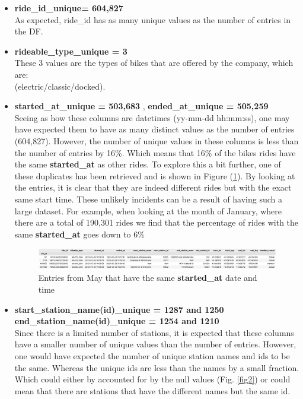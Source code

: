 \documentclass[12pt]{article}
\begin{document}
	\begin{itemize}
	\item \textbf{ride\_id\_unique= 604,827}   \\
	As expected, ride\_id has as many unique values as the number of entries in the DF.
	\item \textbf{rideable\_type\_unique = 3}  \\
	These 3 values are the types of bikes that are offered by the company, which are: \\
	(electric/classic/docked).
	\item \textbf{started\_at\_unique = 503,683} , \textbf{ended\_at\_unique = 505,259} \\
	Seeing as how these columns are datetimes (yy-mm-dd hh:mm:ss), one may have expected them to have as many distinct values as the number of entries (604,827). However, the number of unique values in these columns is less than the number of entries by 16\%. Which means that 16\% of the bikes rides have the same \textbf{started\_at} as other rides. To explore this a bit further, one of these duplicates has been retrieved and is shown in Figure (\underline{\ref{fig10}}). By looking at the entries, it is clear that they are indeed different rides but with the exact same start time. These unlikely incidents can be a result of having such a large dataset. For example, when looking at the month of January, where there are a total of 190,301 rides we find that the percentage of rides with the same \textbf{started\_at} goes down to 6\%  \\
	
	\begin{figure}[h]
	\hspace{0.3in}
	\includegraphics[scale=0.4]{imgDups1.png}
	\caption{Entries from May that have the same \textbf{started\_at} date and time}
	\label{fig10}
	\end{figure}
	
	\item \textbf{start\_station\_name(id)\_unique = 1287 and 1250}\\
	 \textbf{end\_station\_name(id)\_unique = 1254 and 1210} \\
	Since there is a limited number of stations, it is expected that these columns have a smaller number of unique values than the number of entries. However, one would have expected the number of unique station names and ids to be the same. Whereas the unique ids are less than the names by a small fraction. Which could either by accounted for by the null values (Fig. \underline{\ref{fig2}}) or could mean that there are stations that have the different names but the same id.
	

\end{itemize}
\end{document}
